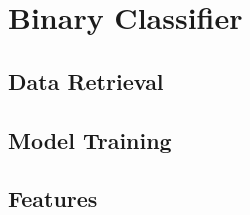\chapter{Binary Classifier}
\label{chap:classifier}

\section{Data Retrieval}
\label{sec:DataRetrieval}



\section{Model Training}
\label{sec:ModelTraining}

\section{Features}
\label{sec:Features}
